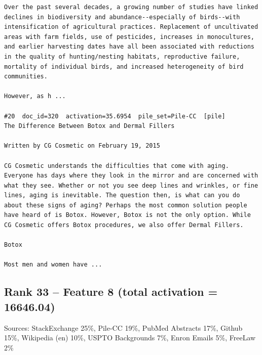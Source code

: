 \begin{verbatim}
Over the past several decades, a growing number of studies have linked declines in biodiversity and abundance--especially of birds--with intensification of agricultural practices. Replacement of uncultivated areas with farm fields, use of pesticides, increases in monocultures, and earlier harvesting dates have all been associated with reductions in the quality of hunting/nesting habitats, reproductive failure, mortality of individual birds, and increased heterogeneity of bird communities.

However, as h ...

#20  doc_id=320  activation=35.6954  pile_set=Pile-CC  [pile]
The Difference Between Botox and Dermal Fillers

Written by CG Cosmetic on February 19, 2015

CG Cosmetic understands the difficulties that come with aging. Everyone has days where they look in the mirror and are concerned with what they see. Whether or not you see deep lines and wrinkles, or fine lines, aging is inevitable. The question then, is what can you do about these signs of aging? Perhaps the most common solution people have heard of is Botox. However, Botox is not the only option. While CG Cosmetic offers Botox procedures, we also offer Dermal Fillers.

Botox

Most men and women have ...

\end{verbatim}

\subsection*{Rank 33 -- Feature 8 (total activation = 16646.04)}

Sources: StackExchange 25\%, Pile-CC 19\%, PubMed Abstracts 17\%, Github 15\%, Wikipedia (en) 10\%, USPTO Backgrounds 7\%, Enron Emails 5\%, FreeLaw 2\%

